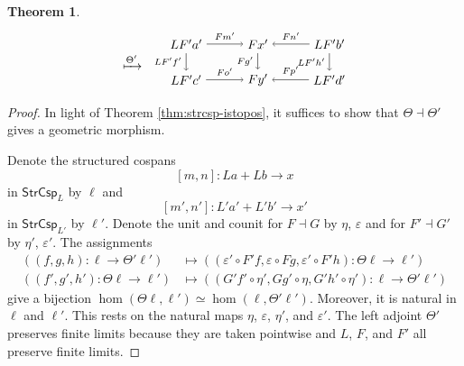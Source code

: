 \documentclass{amsart}
\newcommand{\StrCsp}{\cat{StrCsp}}
\newcommand{\cat}[1]{\mathsf{#1}}
\newcommand{\from}{\colon}
\newcommand{\csp}[3]{#1 + #3 \to #2}
\newtheorem{theorem}{Theorem}[section]
\theoremstyle{remark}
\theoremstyle{definition}
\begin{document}
\begin{theorem}
\[\begin{tikzpicture}
\begin{scope}[shift={(3,0)}]
      \node (1) at (0,0.5) { $ \xmapsto{ \Theta' } $ };
      \end{scope}
      \begin{scope}[shift={(6.5,0)}]
      \node (1) at (-2,1) {\( LF'a' \)};
      \node (2) at (0,1) {\( Fx' \)};
      \node (3) at (2,1) {\( LF'b' \)};
      \node (4) at (-2,0) {\( LF'c' \)};
      \node (5) at (0,0) {\( Fy' \)};
      \node (6) at (2,0) {\( LF'd' \)};
      \draw [->] (1) to node [above] {\scriptsize{\( Fm' \)}} (2);
      \draw [->] (3) to node [above] {\scriptsize{\( Fn' \)}} (2);
      \draw [->] (4) to node [above] {\scriptsize{\( Fo' \)}} (5);
      \draw [->] (6) to node [above] {\scriptsize{\( Fp' \)}} (5);
      \draw [->] (1) to node [left] {\scriptsize{\( LF'f' \)}} (4);
      \draw [->] (2) to node [left] {\scriptsize{\( Fg' \)}} (5);
      \draw [->] (3) to node [left] {\scriptsize{\( LF'h' \)}} (6);  
      \end{scope}
    \end{tikzpicture}
  \]  
\end{theorem}

\begin{proof}
  In light of Theorem \ref{thm:strcsp-istopos}, it suffices
  to show that $ \Theta \dashv \Theta' $ gives a geometric
  morphism.

  Denote the structured cospans
  \[
    [ m,n ] \colon \csp{La}{x}{Lb}
  \]
  in $ \StrCsp_{ L } $ by $ \ell $ and  
  \[
    [m',n'] \colon \csp{L'a'}{x'}{L'b'}
  \]
  in $ \StrCsp_{ L' } $ by $ \ell' $. Denote the unit and
  counit for $F \dashv G$ by $ \eta $, $ \varepsilon $ and
  for $ F' \dashv G' $ by $ \eta' $, $ \varepsilon' $.  The
  assignments
  \begin{align*}
    \left(
      ( f,g,h ) \from \ell \to \Theta' \ell'
      \right)
    & \mapsto
    \left(
      ( \varepsilon' \circ F'f , \varepsilon \circ Fg , \varepsilon'
      \circ F'h )
      \from \Theta \ell \to \ell'
      \right) \\
      \left(
      ( f',g',h' ) \from \Theta \ell \to \ell'
      \right)
    & \mapsto
      \left(
      ( G'f' \circ \eta', Gg' \circ \eta , G'h' \circ \eta' )
      \from \ell \to \Theta' \ell'
      \right) 
  \end{align*}
  give a bijection
  $ \hom ( \Theta \ell , \ell' ) \simeq \hom ( \ell ,
  \Theta' \ell' ) $. Moreover, it is natural in $ \ell $ and
  $ \ell' $. This rests on the natural maps $ \eta $,
  $ \varepsilon $, $ \eta' $, and $ \varepsilon' $. The left
  adjoint $ \Theta' $ preserves finite limits because they
  are taken pointwise and $ L $, $ F $, and $ F' $ all
  preserve finite limits.
\end{proof}
\end{document}
